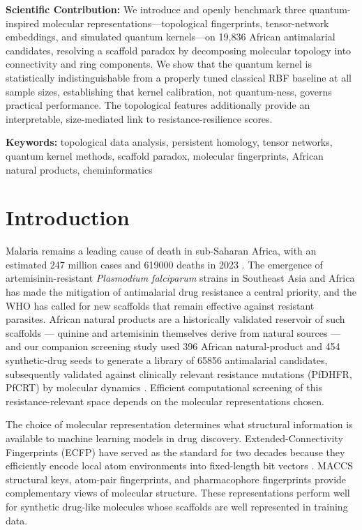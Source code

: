 \documentclass[11pt,a4paper]{article}
\begin{document}
\textbf{Scientific Contribution:} We introduce and openly benchmark three quantum-inspired molecular representations---topological fingerprints, tensor-network embeddings, and simulated quantum kernels---on 19{,}836 African antimalarial candidates, resolving a scaffold paradox by decomposing molecular topology into connectivity and ring components. We show that the quantum kernel is statistically indistinguishable from a properly tuned classical RBF baseline at all sample sizes, establishing that kernel calibration, not quantum-ness, governs practical performance. The topological features additionally provide an interpretable, size-mediated link to resistance-resilience scores.

\noindent\textbf{Keywords:} topological data analysis, persistent homology, tensor networks, quantum kernel methods, scaffold paradox, molecular fingerprints, African natural products, cheminformatics


\section{Introduction}

Malaria remains a leading cause of death in sub-Saharan Africa, with an estimated \num{247} million cases and \num{619000} deaths in 2023 \citep{who2024malariareport}. The emergence of artemisinin-resistant \emph{Plasmodium falciparum} strains in Southeast Asia and Africa \citep{ariyey2014,ashley2018} has made the mitigation of antimalarial drug resistance a central priority, and the WHO has called for new scaffolds that remain effective against resistant parasites. African natural products are a historically validated reservoir of such scaffolds --- quinine and artemisinin themselves derive from natural sources --- and our companion screening study \citep{temgoua2026antimalarial} used \num{396} African natural-product and \num{454} synthetic-drug seeds to generate a library of \num{65856} antimalarial candidates, subsequently validated against clinically relevant resistance mutations (PfDHFR, PfCRT) by molecular dynamics \citep{temgoua2027md}. Efficient computational screening of this resistance-relevant space depends on the molecular representations chosen.

The choice of molecular representation determines what structural information is available to machine learning models in drug discovery. Extended-Connectivity Fingerprints (ECFP) have served as the standard for two decades because they efficiently encode local atom environments into fixed-length bit vectors \citep{ecfp_2010}. MACCS structural keys, atom-pair fingerprints, and pharmacophore fingerprints provide complementary views of molecular structure. These representations perform well for synthetic drug-like molecules whose scaffolds are well represented in training data.
\end{document}
